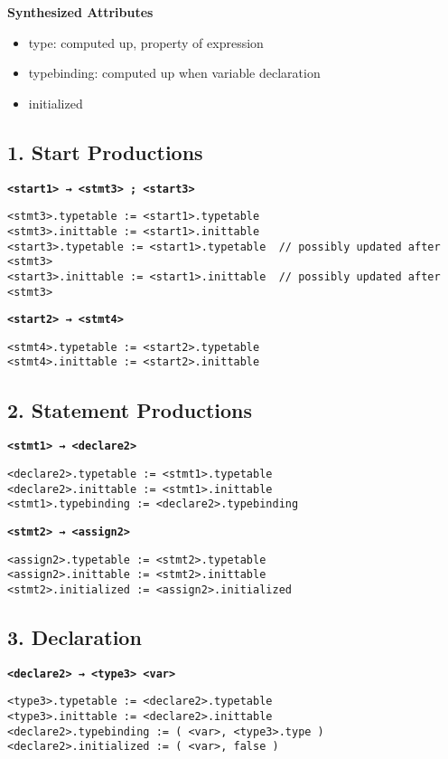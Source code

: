 \documentclass[12pt]{article}
\begin{document}
    \textbf{Synthesized Attributes}
    \begin{itemize}
        \item type: computed up, property of expression
        \item typebinding: computed up when variable declaration
        \item initialized
    \end{itemize}

    \subsection*{1. Start Productions}

    \textbf{\texttt{<start1> → <stmt3> ; <start3>}}
    \begin{verbatim}
<stmt3>.typetable := <start1>.typetable
<stmt3>.inittable := <start1>.inittable
<start3>.typetable := <start1>.typetable  // possibly updated after <stmt3>
<start3>.inittable := <start1>.inittable  // possibly updated after <stmt3>
    \end{verbatim}

    \textbf{\texttt{<start2> → <stmt4>}}
    \begin{verbatim}
<stmt4>.typetable := <start2>.typetable
<stmt4>.inittable := <start2>.inittable
    \end{verbatim}

    \subsection*{2. Statement Productions}

    \textbf{\texttt{<stmt1> → <declare2>}}
    \begin{verbatim}
<declare2>.typetable := <stmt1>.typetable
<declare2>.inittable := <stmt1>.inittable
<stmt1>.typebinding := <declare2>.typebinding
    \end{verbatim}

    \textbf{\texttt{<stmt2> → <assign2>}}
    \begin{verbatim}
<assign2>.typetable := <stmt2>.typetable
<assign2>.inittable := <stmt2>.inittable
<stmt2>.initialized := <assign2>.initialized
    \end{verbatim}

    \subsection*{3. Declaration}

    \textbf{\texttt{<declare2> → <type3> <var>}}
    \begin{verbatim}
<type3>.typetable := <declare2>.typetable
<type3>.inittable := <declare2>.inittable
<declare2>.typebinding := ( <var>, <type3>.type )
<declare2>.initialized := ( <var>, false )
    \end{verbatim}
\end{document}
